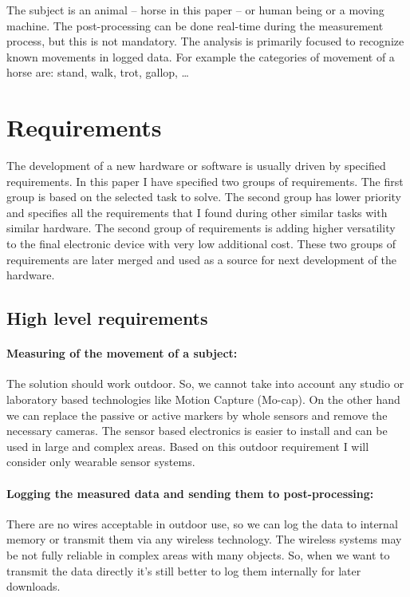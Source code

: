 The subject is an animal -- horse in this paper -- or human being or a moving machine. The post-processing can be done real-time during the measurement process, but this is not mandatory. The analysis is primarily focused to recognize known movements in logged data. For example the categories of movement of a horse are: stand, walk, trot, gallop, \dots

\section{Requirements}
\label{HWrequirements}
The development of a new hardware or software is usually driven by specified requirements. In this paper I have specified two groups of requirements. The first group is based on the selected task to solve. The second group has lower priority and specifies all the requirements that I found during other similar tasks with similar hardware. The second group of requirements is adding higher versatility to the final electronic device with very low additional cost. These two groups of requirements are later merged and used as a source for next development of the hardware.

\subsection{High level requirements}

\paragraph{Measuring of the movement of a subject:} The solution should work outdoor. So, we cannot take into account any studio or laboratory based technologies like Motion Capture (Mo-cap). On the other hand we can replace the passive or active markers by whole sensors and remove the necessary cameras. The sensor based electronics is easier to install and can be used in large and complex areas. Based on this outdoor requirement I will consider only wearable sensor systems.

\paragraph{Logging the measured data and sending them to post-processing:} There are no wires acceptable in outdoor use, so we can log the data to internal memory or transmit them via any wireless technology. The wireless systems may be not fully reliable in complex areas with many objects. So, when we want to transmit the data directly it's still better to log them internally for later downloads.

